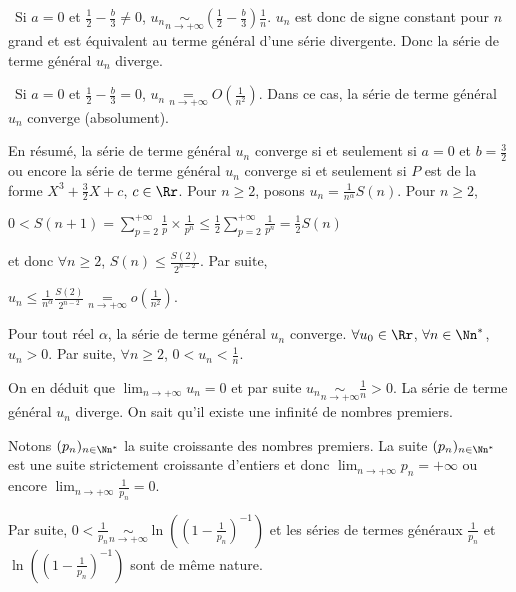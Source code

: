 {{\textbullet~Si $a=0$ et $\frac{1}{2}-\frac{b}{3}\neq0$, $u_n\underset{n\rightarrow+\infty}{\sim}\left(\frac{1}{2}-\frac{b}{3}\right)\frac{1}{n}$. $u_n$ est donc de signe constant pour $n$ grand et est équivalent au terme général d'une série divergente. Donc la série de terme général $u_n$ diverge.

\textbullet~Si $a = 0$ et $\frac{1}{2}-\frac{b}{3}= 0$, $u_n\underset{n\rightarrow+\infty}{=}O\left(\frac{1}{n^2}\right)$. Dans ce cas, la série de terme général $u_n$ converge (absolument).

En résumé, la série de terme général $u_n$ converge si et seulement si $a = 0$ et  $b=\frac{3}{2}$ ou encore la série de terme général $u_n$ converge si et seulement si $P$ est de la forme $X^3+\frac{3}{2}X+c$, $c\in\Rr$.
Pour $n\geqslant2$, posons $u_n=\frac{1}{n^\alpha}S(n)$. Pour $n\geqslant2$,

\begin{center}
$0<S(n+1)=\sum_{p=2}^{+\infty}\frac{1}{p}\times\frac{1}{p^n}\leqslant\frac{1}{2}\sum_{p=2}^{+\infty}\frac{1}{p^n}=\frac{1}{2}S(n)$
\end{center}

et donc $\forall n\geqslant2$, $S(n)\leqslant\frac{S(2)}{2^{n-2}}$. Par suite,

\begin{center}
$u_n\leqslant\frac{1}{n^\alpha}\frac{S(2)}{2^{n-2}}\underset{n\rightarrow+\infty}{=}o\left(\frac{1}{n^2}\right)$.
\end{center}

Pour tout réel $\alpha$, la série de terme général $u_n$ converge.
$\forall u_0\in\Rr$, $\forall n\in\Nn^*$, $u_n > 0$. Par suite, $\forall n\geqslant 2$, $0< u_n<\frac{1}{n}$.

On en déduit que $\lim_{n \rightarrow +\infty}u_n=0$ et par suite $u_n\underset{n\rightarrow+\infty}{\sim}\frac{1}{n}>0$. La série de terme général $u_n$ diverge.
On sait qu'il existe une infinité de nombres premiers.

Notons $(p_n)_{n\in\Nn^*}$ la suite croissante des nombres premiers. La suite $(p_n)_{n\in\Nn^*}$ est une suite strictement croissante d'entiers et donc $\lim_{n \rightarrow +\infty}p_n= +\infty$ ou encore $\lim_{n \rightarrow +\infty}\frac{1}{p_n}=0$.

Par suite, $0<\frac{1}{p_n}\underset{n\rightarrow+\infty}{\sim}\ln\left(\left(1-\frac{1}{p_n}\right)^{-1}\right)$ et les séries de termes généraux $\frac{1}{p_n}$ et $\ln\left(\left(1-\frac{1}{p_n}\right)^{-1}\right)$ sont de même nature.

}}
